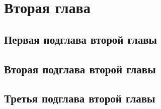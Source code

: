 \section{Вторая глава}
\subsection{Первая подглава второй главы}

\subsection{Вторая подглава второй главы}
\subsection{Третья подглава второй главы}